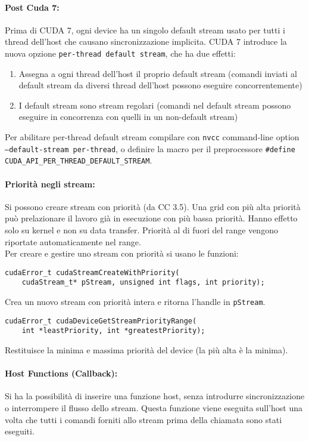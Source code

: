 \paragraph{Post Cuda 7:} Prima di CUDA 7, ogni device ha un singolo default stream usato per tutti i thread dell'host che causano sincronizzazione implicita. CUDA 7 introduce la nuova opzione \texttt{per-thread default stream}, che ha due effetti:
\begin{enumerate}
	\item Assegna a ogni thread dell’host il proprio default stream (comandi inviati al default stream da diversi thread dell'host possono eseguire concorrentemente)
	\item I default stream sono stream regolari (comandi nel default stream possono eseguire in concorrenza con quelli in un non-default stream)
\end{enumerate}
Per abilitare per-thread default stream compilare con \texttt{nvcc} command-line option \texttt{--default-stream per-thread}, o definire la macro per il preprocessore \texttt{\#define CUDA\_API\_PER\_THREAD\_DEFAULT\_STREAM}.\\

\paragraph{Priorità negli stream:} Si possono creare stream con priorità (da CC 3.5). Una grid con più alta priorità può prelazionare il lavoro già in esecuzione con più bassa priorità. Hanno effetto solo su kernel e non su data transfer. Priorità al di fuori del range vengono riportate automaticamente nel range.\\

Per creare e gestire uno stream con priorità si usano le funzioni:
\begin{verbatim}
cudaError_t cudaStreamCreateWithPriority(
	cudaStream_t* pStream, unsigned int flags, int priority);
\end{verbatim}
Crea un nuovo stream con priorità intera e ritorna l'handle in \texttt{pStream}.

\begin{verbatim}
cudaError_t cudaDeviceGetStreamPriorityRange(
	int *leastPriority, int *greatestPriority);
\end{verbatim}
Restituisce la minima e massima priorità del device (la più alta è la minima).\\

\paragraph{Host Functions (Callback):} Si ha la possibilità di inserire una funzione host, senza introdurre sincronizzazione o interrompere il flusso dello stream. Questa funzione viene eseguita sull'host una volta che tutti i comandi forniti allo stream prima della chiamata sono stati eseguiti.\\

